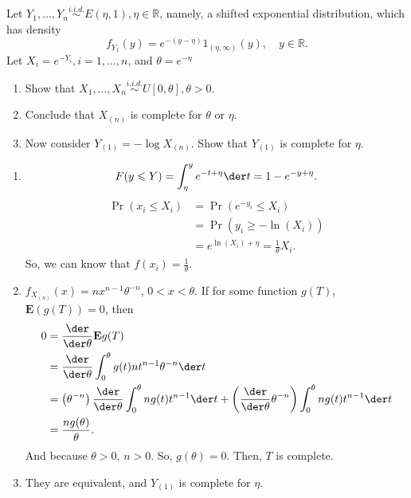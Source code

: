 \begin{ex}
    Let \(Y_{1}, \ldots, Y_{n} \stackrel{i.i.d. }{\sim} E(\eta, 1), \eta \in \mathbb{R}\), namely, a shifted exponential distribution, which has density
    \[
    f_{Y_{1}}(y)=e^{-(y-\eta)} 1_{(\eta, \infty)}(y), \quad y \in \mathbb{R} .
    \]
    Let \(X_{i}=e^{-Y_{i}}, i=1, \ldots, n\), and \(\theta=e^{-\eta}\)
    \begin{enumerate}
        \item Show that \(X_{1}, \ldots, X_{n} \stackrel{i.i.d. }{\sim} U[0, \theta], \theta>0\). 
        \item Conclude that \(X_{(n)}\) is complete for \(\theta\) or \(\eta\). 
        \item Now consider \(Y_{(1)}=-\log X_{(n)}\). Show that \(Y_{(1)}\) is complete for \(\eta\). 
    \end{enumerate}
\end{ex}

\begin{solution}
    \begin{enumerate}
        \item \[
            F(y\leqslant Y)=\int_\eta^ye^{-t+\eta}\der t= 1-e^{-y+\eta}. 
        \]
        \[
            \begin{aligned}
                \Pr(x_i\leqslant X_i)&=\Pr(e^{-y_i}\leqslant X_i)\\
                &=\Pr(y_i\geqslant -\ln(X_i))\\
                &=e^{\ln(X_i)+\eta}=\frac{1}{\theta}X_i. 
            \end{aligned}
        \]
        So, we can know that \(f(x_i)=\frac{1}{\theta}\). 
        \item $f_{X_{(n)}}(x)=nx^{n-1}\theta^{-n}$, $0<x<\theta$. If for some function $g(T)$, $\mathbf{E}(g(T))=0$, then 
        \[
            \begin{aligned}
                0 &=\frac{\der}{\der  \theta} \mathbf{E} g(T) \\
                &=\frac{\der}{\der  \theta} \int_{0}^{\theta} g(t) n t^{n-1} \theta^{-n} \der  t \\
                &=\left(\theta^{-n}\right) \frac{\der}{\der  \theta} \int_{0}^{\theta} n g(t) t^{n-1} \der  t+\left(\frac{\der}{\der  \theta} \theta^{-n}\right) \int_{0}^{\theta} n g(t) t^{n-1} \der  t\\
                &=\frac{ng(\theta)}{\theta}. 
            \end{aligned}
        \]
        And because $\theta>0$, $n>0$. So, $g(\theta)=0$. Then, $T$ is complete. 
        \item They are equivalent, and $Y_{(1)}$ is complete for $\eta$. 
    \end{enumerate}
\end{solution}

